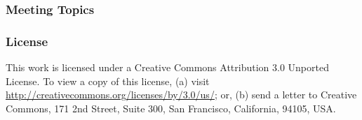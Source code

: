\documentclass{beamer}
\begin{document}
\frame
{
  \frametitle{Meeting Topics}
}


\frame
{
  \frametitle{License}

  This work is licensed under a Creative Commons Attribution 3.0
  Unported License. To view a copy of this license, (a) visit
  \url{http://creativecommons.org/licenses/by/3.0/us/}; or, (b) send a
  letter to Creative Commons, 171 2nd Street, Suite 300, San Francisco,
  California, 94105, USA.
}
\end{document}
